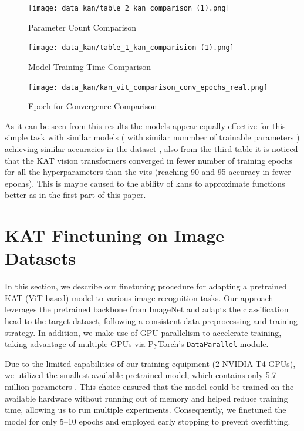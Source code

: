 \documentclass[conference]{IEEEtran}
\begin{document}

\begin{figure}
    \centering
    \texttt{[image: data\_kan/table\_2\_kan\_comparison (1).png]}
    \caption{Parameter Count Comparison}
    \label{fig:table3}
\end{figure}

\begin{figure}
    \centering
    \texttt{[image: data\_kan/table\_1\_kan\_comparision (1).png]}
    \caption{Model Training Time Comparison}
    \label{fig:table1}
\end{figure}

\begin{figure}
    \centering
    \texttt{[image: data\_kan/kan\_vit\_comparison\_conv\_epochs\_real.png]}
    \caption{Epoch for Convergence Comparison}
    \label{fig:table2}
\end{figure}

As it can be seen from this results the models appear equally effective for
this simple task with similar models ( with similar nummber of trainable
parameters ) achieving similar accuracies in the dataset , also from the third
table it is noticed that the KAT vision transformers converged in fewer number
of training epochs for all the hyperparameters than the vits (reaching 90 and
95 accuracy in fewer epochs). This is maybe caused to the ability of kans to
approximate functions better as in the first part of this paper.

\FloatBarrier

\section{KAT Finetuning on Image Datasets}

In this section, we describe our finetuning procedure for adapting a pretrained
KAT (ViT-based) model to various image recognition tasks. Our approach
leverages the pretrained backbone from ImageNet \cite{ImageNet} and adapts the
classification head to the target dataset, following a consistent data
preprocessing and training strategy. In addition, we make use of GPU
parallelism to accelerate training, taking advantage of multiple GPUs via
PyTorch's \texttt{DataParallel} module.

Due to the limited capabilities of our training equipment (2 NVIDIA T4 GPUs),
we utilized the smallest available pretrained model, which contains only 5.7
million parameters \cite{kat}. This choice ensured that the model could be
trained on the available hardware without running out of memory and helped
reduce training time, allowing us to run multiple experiments. Consequently, we
finetuned the model for only 5--10 epochs and employed early stopping to
prevent overfitting.
\end{document}

